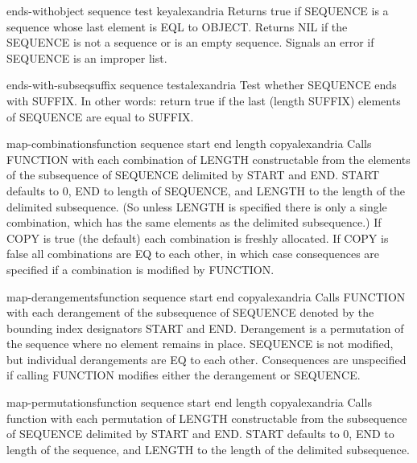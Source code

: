 \begin{function}{ends-with}{object sequence \key test key}{alexandria}{}
  Returns true if SEQUENCE is a sequence whose last element is EQL to OBJECT.
Returns NIL if the SEQUENCE is not a sequence or is an empty sequence. Signals
an error if SEQUENCE is an improper list.
\end{function}

\begin{function}{ends-with-subseq}{suffix sequence \key test}{alexandria}{}
  Test whether SEQUENCE ends with SUFFIX. In other words: return true if
the last (length SUFFIX) elements of SEQUENCE are equal to SUFFIX.
\end{function}

\begin{function}{map-combinations}{function sequence \key start end length copy}{alexandria}{}
  Calls FUNCTION with each combination of LENGTH constructable from the
elements of the subsequence of SEQUENCE delimited by START and END. START
defaults to 0, END to length of SEQUENCE, and LENGTH to the length of the
delimited subsequence. (So unless LENGTH is specified there is only a single
combination, which has the same elements as the delimited subsequence.) If
COPY is true (the default) each combination is freshly allocated. If COPY is
false all combinations are EQ to each other, in which case consequences are
specified if a combination is modified by FUNCTION.
\end{function}

\begin{function}{map-derangements}{function sequence \key start end copy}{alexandria}{}
  Calls FUNCTION with each derangement of the subsequence of SEQUENCE denoted
by the bounding index designators START and END. Derangement is a permutation
of the sequence where no element remains in place. SEQUENCE is not modified,
but individual derangements are EQ to each other. Consequences are unspecified
if calling FUNCTION modifies either the derangement or SEQUENCE.
\end{function}

\begin{function}{map-permutations}{function sequence \key start end length copy}{alexandria}{}
  Calls function with each permutation of LENGTH constructable
from the subsequence of SEQUENCE delimited by START and END. START
defaults to 0, END to length of the sequence, and LENGTH to the
length of the delimited subsequence.
\end{function}

